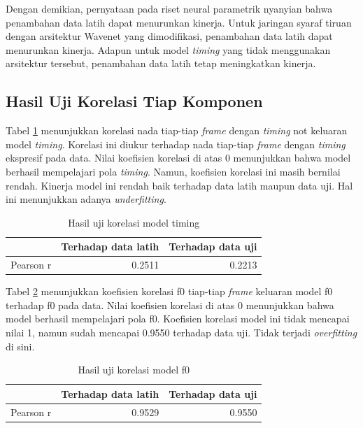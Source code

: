 Dengan demikian, pernyataan pada riset neural parametrik nyanyian bahwa penambahan data latih dapat menurunkan kinerja. Untuk jaringan syaraf tiruan dengan arsitektur Wavenet yang dimodifikasi, penambahan data latih dapat menurunkan kinerja. Adapun untuk model \textit{timing} yang tidak menggunakan arsitektur tersebut, penambahan data latih tetap meningkatkan kinerja.

\subsection{Hasil Uji Korelasi Tiap Komponen}

Tabel \ref{tab-timing-testing-results} menunjukkan korelasi nada tiap-tiap \textit{frame} dengan \textit{timing} not keluaran model \textit{timing}. Korelasi ini diukur terhadap nada tiap-tiap \textit{frame} dengan \textit{timing} ekspresif pada data. Nilai koefisien korelasi di atas 0 menunjukkan bahwa model berhasil mempelajari pola \textit{timing}. Namun, koefisien korelasi ini masih bernilai rendah. Kinerja model ini rendah baik terhadap data latih maupun data uji. Hal ini menunjukkan adanya \textit{underfitting}.

\begin{table}[htbp]
    \centering
    \caption{Hasil uji korelasi model timing}\label{tab-timing-testing-results}
    \begin{tabular}{ |l|r|r| } 
     \cline{2-3}
     \multicolumn{1}{l|}{}&Terhadap data latih&Terhadap data uji\\\hline
	 Pearson r&0.2511  &0.2213\\\hline
    \end{tabular}
\end{table}

Tabel \ref{tab-f0-testing-results} menunjukkan koefisien korelasi f0 tiap-tiap \textit{frame} keluaran model f0 terhadap f0 pada data. Nilai koefisien korelasi di atas 0 menunjukkan bahwa model berhasil mempelajari pola f0. Koefisien korelasi model ini tidak mencapai nilai 1, namun sudah mencapai 0.9550 terhadap data uji. Tidak terjadi \textit{overfitting} di sini.
\begin{table}[htbp]
    \centering
    \caption{Hasil uji korelasi model f0}\label{tab-f0-testing-results}
    \begin{tabular}{ |l|r|r| } 
     \cline{2-3}
     \multicolumn{1}{l|}{}&Terhadap data latih&Terhadap data uji\\\hline
	 Pearson r&0.9529  &0.9550\\\hline
    \end{tabular}
\end{table}

